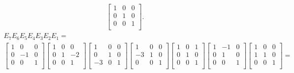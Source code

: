 \documentclass[12pt]{article}
\begin{document}
\begin{enumerate}
\begin{align*}
\begin{bmatrix}
        1 & 0 & 0\\
        0 & 1 & 0\\
        0 & 0 & 1\\
      \end{bmatrix}.
    \end{align*}
    \begin{align*}
      E_7E_6E_5E_4E_3E_2E_1 =\\
      \begin{bmatrix}
        1 &  0 & 0\\
        0 & -1 & 0\\
        0 &  0 & 1\\
      \end{bmatrix}
      \begin{bmatrix}
        1 & 0 & 0\\
        0 & 1 & -2\\
        0 & 0 & 1\\
      \end{bmatrix}
      \begin{bmatrix}
         1 &  0 & 0\\
         0 &  1 & 0\\
        -3 &  0 & 1\\
      \end{bmatrix}
      \begin{bmatrix}
         1 &  0 & 0\\
        -3 &  1 & 0\\
         0 &  0 & 1\\
      \end{bmatrix}
      \begin{bmatrix}
        1 &  0 & 1\\
        0 &  1 & 0\\
        0 &  0 & 1\\
      \end{bmatrix}
      \begin{bmatrix}
        1 & -1 & 0\\
        0 &  1 & 0\\
        0 &  0 & 1\\
      \end{bmatrix}
      \begin{bmatrix}
        1 &  0 & 0\\
        1 &  1 & 0\\
        0 &  0 & 1\\
      \end{bmatrix} =\\

\end{align*}
\end{enumerate}
\end{document}
